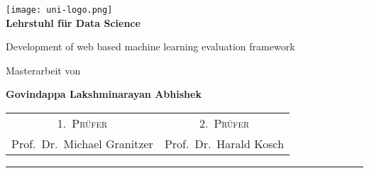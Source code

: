 \begin{titlepage}
    \centering
    \begin{onehalfspace}
    	
        	\texttt{[image: uni-logo.png]}\\
        	\vspace{1.0cm}
        	\large {\bfseries Lehrstuhl f\"ur Data Science }\\

        	\vspace{2.5cm}

            \begin{doublespace}
            	{\textsf{\Huge{Development of web based machine learning evaluation framework}}}
            \end{doublespace}

        	\vspace{2cm}

            \Large{Masterarbeit von}\\

        	\vspace{1cm}

        	{\bfseries \large{Govindappa Lakshminarayan Abhishek}}

        	\vfill

        	{\large
        		\begin{tabular}[l]{cc}
        			\textsc{1.~Pr\"ufer} & \textsc{2.~Pr\"ufer} \\
        			Prof.~Dr.~Michael Granitzer& Prof.~Dr.~Harald Kosch
        		\end{tabular}
        	}

        	\vspace{1.5cm}

        	\parbox{\linewidth}{\hrule\strut}

            \vfill

	    \thedate
    \end{onehalfspace}
\end{titlepage}
